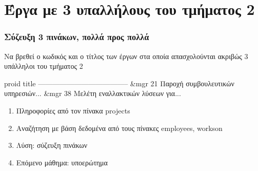 \section[]{\textgreek{Έργα με 3 υπαλλήλους του τμήματος 2}}


\begin{frame}
\frametitle{Σύζευξη 3 πινάκων, πολλά προς πολλά}
\begin{minipage}{\wE}
\vspace{-0.5cm}
\begin{block}{\small Να βρεθεί ο κωδικός και ο τίτλος των έργων στα οποία απασχολούνται
ακριβώς 3 υπάλληλοι του τμήματος 2}
\pause  
\en
\begin{SQL}
proid   title
--------------------------------------
&mgr{    21  Παροχή συμβουλευτικών υπηρεσιών...}
&mgr{    38  Μελέτη εναλλακτικών λύσεων για...}
\end{SQL}
\el
\end{block}
\pause
\begin{enumerate} \itemsep 4pt
  \item Πληροφορίες από τον πίνακα {\ra projects}
  \item Αναζήτηση με βάση δεδομένα από τους πίνακες {\ra employees, workson}
  \item Λύση: {\crr σύζευξη πινάκων}
  \item Επόμενο μάθημα: {\cee υποερώτημα}
\end{enumerate}
\end{minipage}
\end{frame}




